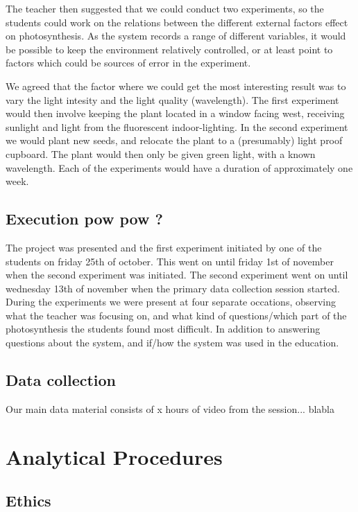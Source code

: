 The teacher then suggested that we could conduct two experiments, so the students could work on the relations between the different external factors effect on photosynthesis. As the system records a range of different variables, it would be possible to keep the environment relatively controlled, or at least point to factors which could be sources of error in the experiment. 

We agreed that the factor where we could get the most interesting result was to vary the light intesity and the light quality (wavelength). The first experiment would then involve keeping the plant located in a window facing west, receiving sunlight and light from the fluorescent indoor-lighting. In the second experiment we would plant new seeds, and relocate the plant to a (presumably) light proof cupboard. The plant would then only be given green light, with a known wavelength. Each of the experiments would have a duration of approximately one week. 

\subsection{Execution pow pow ?}
The project was presented and the first experiment initiated by one of the students on friday 25th of october. This went on until friday 1st of november when the second experiment was initiated. The second experiment went on until wednesday 13th of november when the primary data collection session started. During the experiments we were present at four separate occations, observing what the teacher was focusing on, and what kind of questions/which part of the photosynthesis the students found most difficult. In addition to answering questions about the system, and if/how the system was used in the education. 

\subsection{Data collection}


Our main data material consists of x hours of video from the session... blabla

\section{Analytical Procedures}

\subsection{Ethics}




